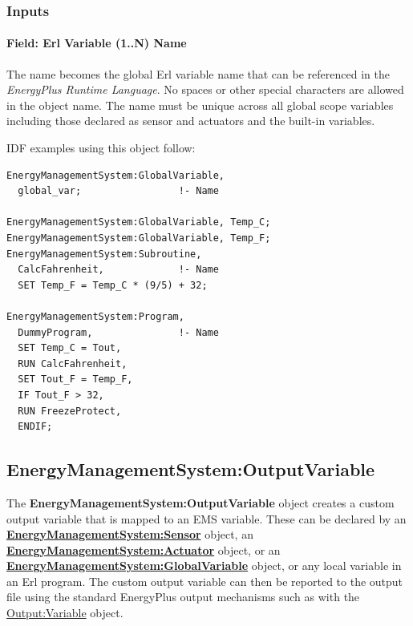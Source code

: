 \subsubsection{Inputs}\label{inputs-5-009}

\paragraph{Field: Erl Variable (1..N) Name}\label{field-erl-variable-1..n-name}

The name becomes the global Erl variable name that can be referenced in the \emph{EnergyPlus Runtime Language}. No spaces or other special characters are allowed in the object name. The name must be unique across all global scope variables including those declared as sensor and actuators and the built-in variables.

IDF examples using this object follow:

\begin{lstlisting}
EnergyManagementSystem:GlobalVariable,
  global_var;                 !- Name

EnergyManagementSystem:GlobalVariable, Temp_C;
EnergyManagementSystem:GlobalVariable, Temp_F;
EnergyManagementSystem:Subroutine,
  CalcFahrenheit,             !- Name
  SET Temp_F = Temp_C * (9/5) + 32;

EnergyManagementSystem:Program,
  DummyProgram,               !- Name
  SET Temp_C = Tout,
  RUN CalcFahrenheit,
  SET Tout_F = Temp_F,
  IF Tout_F > 32,
  RUN FreezeProtect,
  ENDIF;
\end{lstlisting}

\subsection{EnergyManagementSystem:OutputVariable}\label{energymanagementsystemoutputvariable}

The \textbf{EnergyManagementSystem:OutputVariable} object creates a custom output variable that is mapped to an EMS variable. These can be declared by an \textbf{\hyperref[energymanagementsystemsensor]{EnergyManagementSystem:Sensor}} object, an \textbf{\hyperref[energymanagementsystemactuator]{EnergyManagementSystem:Actuator}} object, or an \textbf{\hyperref[energymanagementsystemglobalvariable]{EnergyManagementSystem:GlobalVariable}} object, or any local variable in an Erl program. The custom output variable can then be reported to the output file using the standard EnergyPlus output mechanisms such as with the \hyperref[outputvariable]{Output:Variable} object.

